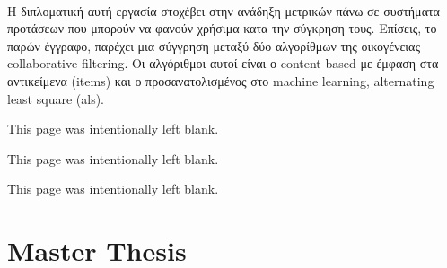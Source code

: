 \documentclass[12pt, a4paper, oneside, greek]{report}
\begin{document}
\paragraph{} Η διπλοματική αυτή εργασία στοχέβει στην ανάδηξη μετρικών πάνω σε συστήματα προτάσεων που μπορούν να φανούν χρήσιμα κατα την σύγκρηση τους. Επίσεις, το παρών έγγραφο, παρέχει μια σύγγρηση μεταξύ δύο αλγορίθμων της οικογένειας collaborative filtering. Οι αλγόριθμοι αυτοί είναι ο content based με έμφαση στα αντικείμενα (items) και ο προσανατολισμένος στο machine learning, alternating least square (als).
\newpage

\tableofcontents
\newpage
\begin{center}
	This page was intentionally left blank.
\end{center}
\newpage
\listoftables
\newpage
\begin{center}
	This page was intentionally left blank.
\end{center}
\newpage
\listoffigures
\newpage

\begin{center}
This page was intentionally left blank.
\end{center}
\newpage
{}
\part{Master Thesis}





\newpage



\end{document}
